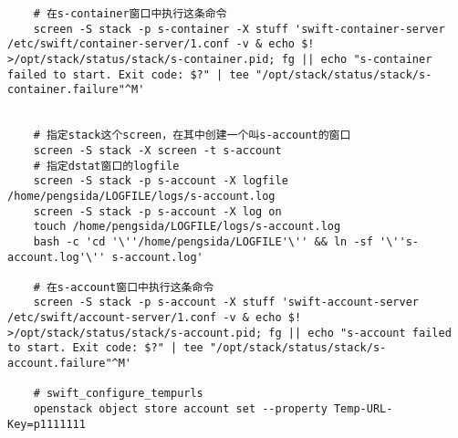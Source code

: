 \documentclass[a4paper,left=1.5cm,right=1.5cm,11pt]{article}
\begin{document}
\begin{lstlisting}
	# 在s-container窗口中执行这条命令
	screen -S stack -p s-container -X stuff 'swift-container-server /etc/swift/container-server/1.conf -v & echo $! >/opt/stack/status/stack/s-container.pid; fg || echo "s-container failed to start. Exit code: $?" | tee "/opt/stack/status/stack/s-container.failure"^M'

	
	# 指定stack这个screen，在其中创建一个叫s-account的窗口
	screen -S stack -X screen -t s-account
	# 指定dstat窗口的logfile
	screen -S stack -p s-account -X logfile /home/pengsida/LOGFILE/logs/s-account.log
    screen -S stack -p s-account -X log on
	touch /home/pengsida/LOGFILE/logs/s-account.log
    bash -c 'cd '\''/home/pengsida/LOGFILE'\'' && ln -sf '\''s-account.log'\'' s-account.log'

	# 在s-account窗口中执行这条命令
	screen -S stack -p s-account -X stuff 'swift-account-server /etc/swift/account-server/1.conf -v & echo $! >/opt/stack/status/stack/s-account.pid; fg || echo "s-account failed to start. Exit code: $?" | tee "/opt/stack/status/stack/s-account.failure"^M'

	# swift_configure_tempurls
	openstack object store account set --property Temp-URL-Key=p1111111
	\end{lstlisting}
\end{document}
